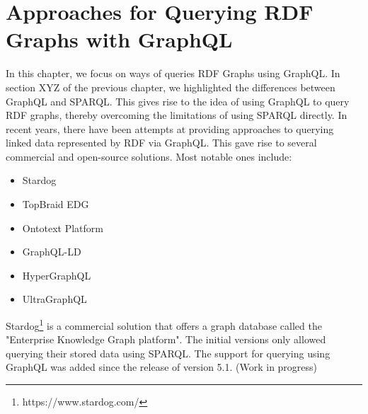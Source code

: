 \chapter{Approaches for Querying RDF Graphs with GraphQL}

In this chapter, we focus on ways of queries RDF Graphs using GraphQL. In section XYZ of the previous chapter, we highlighted the differences between GraphQL and SPARQL. This gives rise to the idea of using GraphQL to query RDF graphs, thereby overcoming the limitations of using SPARQL directly. 
In recent years, there have been attempts at providing approaches to querying linked data represented by RDF via GraphQL. This gave rise to several commercial and open-source solutions. Most notable ones include:

\begin{itemize}
	\item Stardog
	\item TopBraid EDG
	\item Ontotext Platform
	\item GraphQL-LD
	\item HyperGraphQL
	\item UltraGraphQL

\end{itemize}

Stardog\footnote{https://www.stardog.com/} is a commercial solution that offers a graph database called the "Enterprise Knowledge Graph platform"\cite{Angele2022}. The initial versions only allowed querying their stored data using SPARQL. The support for querying using  GraphQL was added since the release of version 5.1. (Work in progress)
